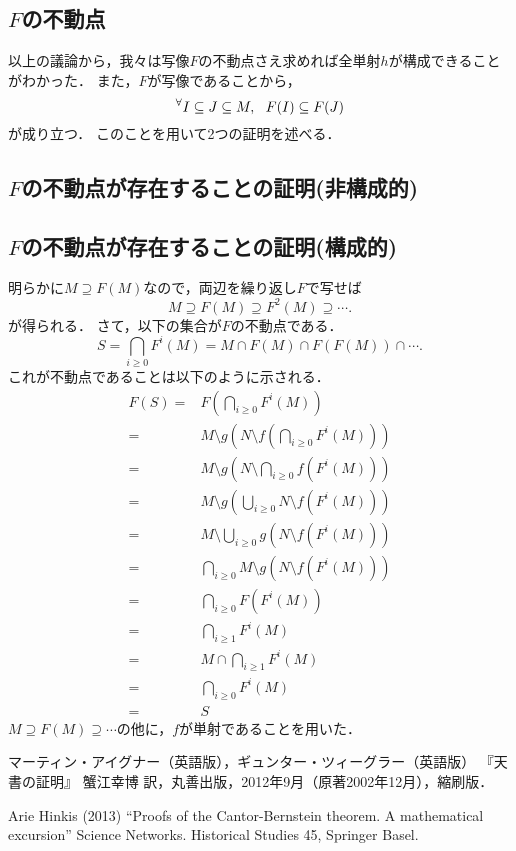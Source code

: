 \documentclass[a4j, 10pt]{jarticle}
\begin{document}
    \subsection{$F$の不動点}
    以上の議論から，我々は写像$F$の不動点さえ求めれば全単射$h$が構成できることがわかった．
    また，$F$が写像であることから，
    \[ {}^{\forall} I \subseteq J \subseteq M,~~ F(I) \subseteq F(J) \]
    が成り立つ．
    このことを用いて2つの証明を述べる．

    \subsection{$F$の不動点が存在することの証明(非構成的)}

    \subsection{$F$の不動点が存在することの証明(構成的)}
    明らかに$M \supseteq F(M)$なので，両辺を繰り返し$F$で写せば
    \[ M \supseteq F(M) \supseteq F^2(M) \supseteq \cdots. \]
    が得られる．
    さて，以下の集合が$F$の不動点である．
    \[ S=\bigcap_{i \geq 0}{F^{i}(M)}=M \cap F(M) \cap F(F(M)) \cap \cdots. \]
    これが不動点であることは以下のように示される．
    \begin{align*}
    F(S)
    =&F \left(\bigcap_{i \geq 0}{F^{i}(M)} \right) \\
    =&M \setminus g \left(N \setminus f \left(\bigcap_{i \geq 0}{F^{i}(M)} \right) \right) \\
    =&M \setminus g \left(N \setminus \bigcap_{i \geq 0}{f(F^{i}(M))} \right)\\
    =&M \setminus g \left(\bigcup_{i \geq 0}{N \setminus f(F^{i}(M))} \right)\\
    =&M \setminus \bigcup_{i \geq 0}{g(N \setminus f(F^{i}(M)))}\\
    =& \bigcap_{i \geq 0}{M \setminus g(N \setminus f(F^{i}(M)))}\\
    =& \bigcap_{i \geq 0}{F(F^{i}(M))} \\
    =& \bigcap_{i \geq 1}{F^{i}(M)} \\
    =& M \cap \bigcap_{i \geq 1}{F^{i}(M)} \\
    =& \bigcap_{i \geq 0}{F^{i}(M)} \\
    =& S
    \end{align*}
    $M \supseteq F(M) \supseteq \cdots$の他に，$f$が単射であることを用いた．

    \begin{thebibliography}{99}
            マーティン・アイグナー（英語版），ギュンター・ツィーグラー（英語版）
            『天書の証明』 蟹江幸博 訳，丸善出版，2012年9月（原著2002年12月），縮刷版．

        Arie Hinkis (2013) 
        ``Proofs of the Cantor-Bernstein theorem. A mathematical excursion''
        Science Networks. Historical Studies 45, Springer Basel.
    \end{thebibliography}
\end{document}
